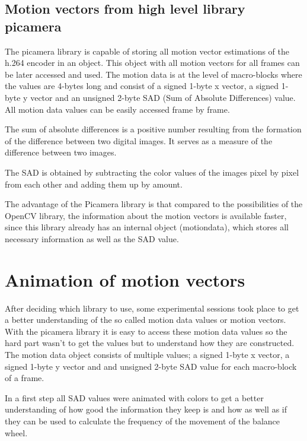 \documentclass[12pt, a4paper]{report}
\begin{document}
    \subsection{Motion vectors from high level library picamera}
    The picamera library is capable of storing all motion vector estimations of the h.264 encoder in an object. This object with all motion vectors for all frames can be later accessed and used. The motion data is at the level of macro-blocks where the values are 4-bytes long and consist of a signed 1-byte x vector, a signed 1-byte y vector and an unsigned 2-byte SAD (Sum of Absolute Differences) value. All motion data values can be easily accessed frame by frame. \cite{ReadTheDocsPicamera}
    
    The sum of absolute differences is a positive number resulting from the formation of the difference between two digital images. It serves as a measure of the difference between two images.
    
    The SAD is obtained by subtracting the color values of the images pixel by pixel from each other and adding them up by amount. 
    
    The advantage of the Picamera library is that compared to the possibilities of the OpenCV library, the information about the motion vectors is available faster, since this library already has an internal object (motiondata), which stores all necessary information as well as the SAD value. 
    
    \section{Animation of motion vectors}
    After deciding which library to use, some experimental sessions took place to get a better understanding of the so called motion data values or motion vectors. 
    With the picamera library it is easy to access these motion data values so the hard part wasn't to get the values but to understand how they are constructed. 
    The motion data object consists of multiple values; a signed 1-byte x vector, a signed 1-byte y vector and and unsigned 2-byte SAD value for each macro-block of a frame.
    
    In a first step all SAD values were animated with colors to get a better understanding of how good the information they keep is and how as well as if they can be used to calculate the frequency of the movement of the balance wheel.
    
\end{document}
